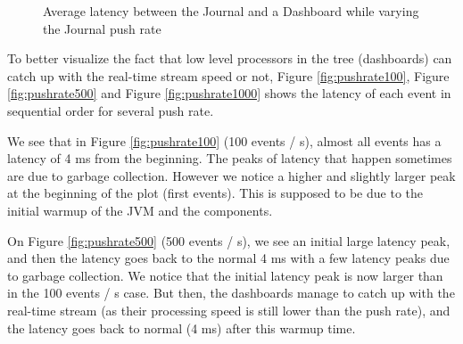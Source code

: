 \begin{figure}
  \begin{center} 
    \caption{Average latency between the Journal and a Dashboard while varying the Journal push rate}
    \label{fig:latencyplot}
  \end{center}
\end{figure}

To better visualize the fact that low level processors in the tree (dashboards) can catch up with the real-time stream speed or not, Figure \ref{fig:pushrate100}, Figure \ref{fig:pushrate500} and Figure \ref{fig:pushrate1000} shows the latency of each event in sequential order for several push rate. 

We see that in Figure \ref{fig:pushrate100} (100 events / s), almost all events has a latency of 4 ms from the beginning. The peaks of latency that happen sometimes are due to garbage collection. However we notice a higher and slightly larger peak at the beginning of the plot (first events). This is supposed to be due to the initial warmup of the JVM and the components.

On Figure \ref{fig:pushrate500} (500 events / s), we see an initial large latency peak, and then the latency goes back to the normal 4 ms with a few latency peaks due to garbage collection. We notice that the initial latency peak is now larger than in the 100 events / s case. But then, the dashboards manage to catch up with the real-time stream (as their processing speed is still lower than the push rate), and the latency goes back to normal (4 ms) after this warmup time.

